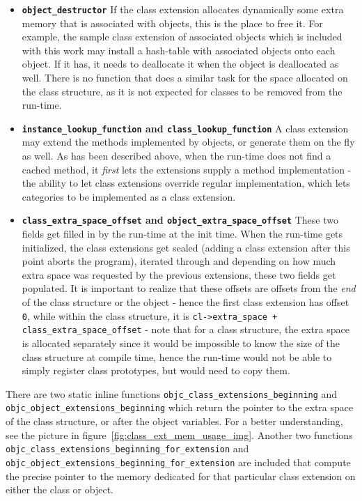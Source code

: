 \begin{itemize}
  \item{\bf{\tt{object\_destructor}}} If the class extension allocates dynamically some extra memory that is associated with objects, this is the place to free it. For example, the sample class extension of associated objects which is included with this work may install a hash-table with associated objects onto each object. If it has, it needs to deallocate it when the object is deallocated as well.
  There is no function that does a similar task for the space allocated on the class structure, as it is not expected for classes to be removed from the run-time.
  \item{\bf{\tt{instance\_lookup\_function}} and \bf{\tt{class\_lookup\_function}}} A class extension may extend the methods implemented by objects, or generate them on the fly as well. As has been described above, when the run-time does not find a cached method, it \emph{first} lets the extensions supply a method implementation - the ability to let class extensions override regular implementation, which lets categories to be implemented as a class extension.
  \item{\bf{\tt{class\_extra\_space\_offset}} and \bf{\tt{object\_extra\_space\_offset}}} These two fields get filled in by the run-time at the init time. When the run-time gets initialized, the class extensions get sealed (adding a class extension after this point aborts the program), iterated through and depending on how much extra space was requested by the previous extensions, these two fields get populated. It is important to realize that these offsets are offsets from the \emph{end} of the class structure or the object - hence the first class extension has offset \texttt{0}, while within the class structure, it is \texttt{cl->extra\_space + class\_extra\_space\_offset} - note that for a class structure, the extra space is allocated separately since it would be impossible to know the size of the class structure at compile time, hence the run-time would not be able to simply register class prototypes, but would need to copy them.
 
\end{itemize}

There are two static inline functions \texttt{objc\_class\_extensions\_beginning} \newline{}and \texttt{objc\_object\_extensions\_beginning} which return the pointer to the extra space of the class structure, or after the object variables. For a better understanding, see the picture in figure~\ref{fig:class_ext_mem_usage_img}. Another two functions \newline{}\texttt{objc\_class\_extensions\_beginning\_for\_extension} and \newline{}\texttt{objc\_object\_extensions\_beginning\_for\_extension} are included that compute the precise pointer to the memory dedicated for that particular class extension on either the class or object.


